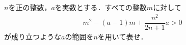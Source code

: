 \documentclass[../../main.tex]{subfiles}
\begin{document}
$n$を正の整数，$a$を実数とする．すべての整数$m$に対して
\begin{align*}
  m^2-(a-1)m+\dfrac{n^2}{2n+1}a>0
\end{align*}
が成り立つような$a$の範囲を$n$を用いて表せ．
\end{document}
